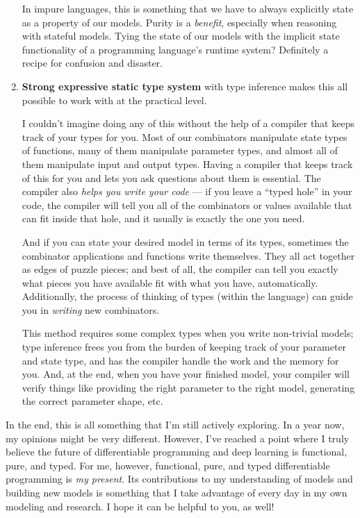 \documentclass[]{article}
\begin{document}
\begin{enumerate}
  In impure languages, this is something that we have to always explicitly state
  as a property of our models. Purity is a \emph{benefit}, especially when
  reasoning with stateful models. Tying the state of our models with the
  implicit state functionality of a programming language's runtime system?
  Definitely a recipe for confusion and disaster.
\item
  \textbf{Strong expressive static type system} with type inference makes this
  all possible to work with at the practical level.

  I couldn't imagine doing any of this without the help of a compiler that keeps
  track of your types for you. Most of our combinators manipulate state types of
  functions, many of them manipulate parameter types, and almost all of them
  manipulate input and output types. Having a compiler that keeps track of this
  for you and lets you ask questions about them is essential. The compiler also
  \emph{helps you write your code} --- if you leave a ``typed hole'' in your
  code, the compiler will tell you all of the combinators or values available
  that can fit inside that hole, and it usually is exactly the one you need.

  And if you can state your desired model in terms of its types, sometimes the
  combinator applications and functions write themselves. They all act together
  as edges of puzzle pieces; and best of all, the compiler can tell you exactly
  what pieces you have available fit with what you have, automatically.
  Additionally, the process of thinking of types (within the language) can guide
  you in \emph{writing} new combinators.

  This method requires some complex types when you write non-trivial models;
  type inference frees you from the burden of keeping track of your parameter
  and state type, and has the compiler handle the work and the memory for you.
  And, at the end, when you have your finished model, your compiler will verify
  things like providing the right parameter to the right model, generating the
  correct parameter shape, etc.
\end{enumerate}

In the end, this is all something that I'm still actively exploring. In a year
now, my opinions might be very different. However, I've reached a point where I
truly believe the future of differentiable programming and deep learning is
functional, pure, and typed. For me, however, functional, pure, and typed
differentiable programming is \emph{my present}. Its contributions to my
understanding of models and building new models is something that I take
advantage of every day in my own modeling and research. I hope it can be helpful
to you, as well!
\end{document}
